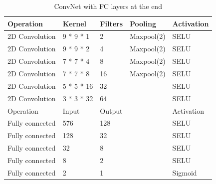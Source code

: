 \documentclass[journal]{IEEEtran}
\begin{document}
\begin{table}[H]
	\caption{ConvNet with FC layers at the end}
	\label{tab:architecture}
	\centering
	\begin{tabular}{lllll}
		\toprule
		Operation & Kernel & Filters & Pooling & Activation
		\\ 
		\midrule
		2D Convolution & 9 * 9 * 1 & 2 & Maxpool(2) & SELU
		\\
		2D Convolution & 9 * 9 * 2 & 4 & Maxpool(2) & SELU
		\\
		2D Convolution & 7 * 7 * 4 & 8 & Maxpool(2) & SELU
		\\
		2D Convolution & 7 * 7 * 8 & 16 & Maxpool(2) & SELU
		\\
		2D Convolution & 5 * 5 * 16 & 32 && SELU
		\\
		2D Convolution & 3 * 3 * 32 & 64 && SELU
		\\
		\midrule
		Operation & Input & Output && Activation
		\\
		\midrule
		Fully connected & 576 & 128 && SELU
		\\
		Fully connected & 128 & 32 && SELU
		\\
		Fully connected & 32 & 8 && SELU
		\\
		Fully connected & 8 & 2 && SELU
		\\
		Fully connected & 2 & 1 && Sigmoid
		\\
		\bottomrule
	\end{tabular}
\end{table}
\end{document}
